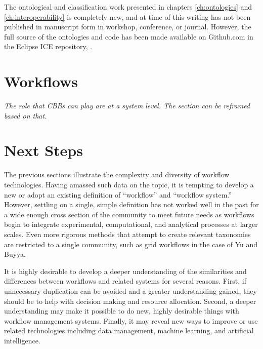 The ontological and classification work presented in chapters
\ref{ch:ontologies} and \ref{ch:interoperability} is completely new, and at
time of this writing has not been published in manuscript form in
workshop, conference, or journal. However, the full source of the ontologies
and code has been made available on Github.com in the Eclipse ICE repository,
\cite{billings_ice}.


\section{Workflows}

\textit{The role that CBBs can play are at a system level. The section can be
reframed based on that.}


\section{Next Steps}

The previous sections illustrate the complexity and diversity of workflow
technologies. Having amassed such data on the topic, it is tempting to develop
a new or adopt an existing definition of ``workflow'' and ``workflow system.''
However, settling on a single, simple definition has not worked well in the past
for a wide enough cross section of the community to meet future needs as workflows
begin to integrate experimental, computational, and analytical processes at
larger scales. Even more rigorous methods that attempt to create relevant
taxonomies are restricted to a single community, such as grid workflows in the
case of Yu and Buyya.

It is highly desirable to develop a deeper understanding of the similarities and
differences between workflows and related systems for several reasons. First, if
unnecessary duplication can be avoided and a greater understanding gained, they
should be to help with decision making and resource allocation. Second, a
deeper understanding may make it possible to do new, highly desirable things
with workflow management systems. Finally, it may reveal new ways to improve or
use related technologies including data management, machine learning, and
artificial intelligence.

